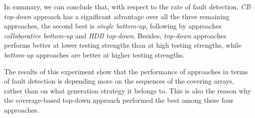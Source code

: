 \documentclass[conference]{IEEEtran}
\theoremstyle{definition}
\begin{document}
In summary, we can conclude that, with respect to the rate of fault detection, \emph{CB top-down} approach has a significant advantage over all the three remaining approaches, the second best is \emph{single bottom-up}, following by approaches  \emph{collaborative bottom-up} and \emph{HDB top-down}. Besides, \emph{top-down} approaches performs better at lower testing strengths than at high testing strengths, while \emph{bottom-up} approaches are better at higher testing strengths. 


The results of this experiment show that the performance of approaches in terms of fault detection is depending more on the sequences of the covering arrays, rather than on what generation strategy it belongs to. This is also the reason why the coverage-based top-down approach performed the best among these four approaches.

\end{document}
